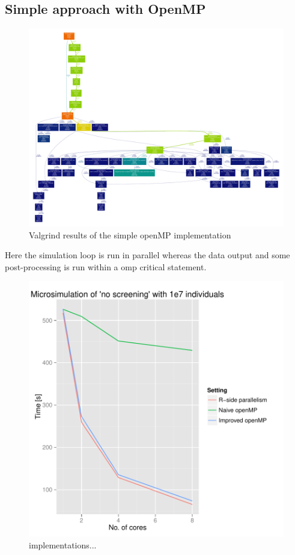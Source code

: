 \subsection{Simple approach with OpenMP}

\begin{figure}[!htbp]
  \centering
  \includegraphics[height=0.85\textheight, angle=90]{images/profOpenMPSimple.pdf}
  \caption{Valgrind results of the simple openMP implementation}
  \label{fig:simpleOpenMP}
\end{figure}

Here the simulation loop is run in parallel whereas the data output
and some post-processing is run within a omp critical statement.

\begin{figure}[!htbp]
  \centering
  \includegraphics[height=0.85\textheight]{images/implementationProfiling.pdf}
  \caption{implementations...}
  \label{fig:implScaling}
\end{figure}

